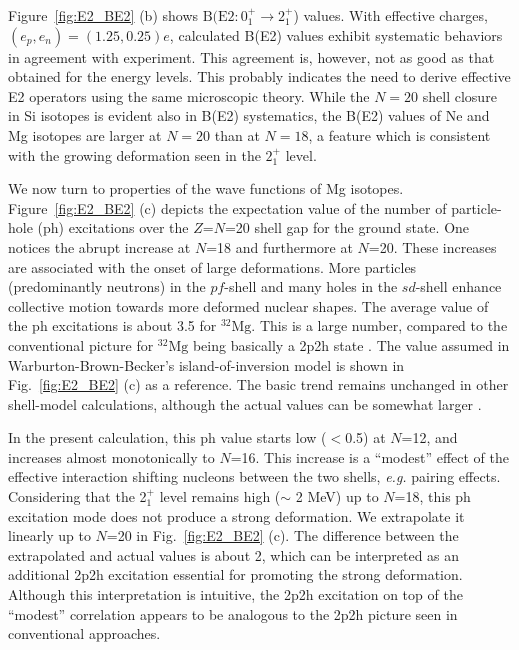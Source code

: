 \documentclass[aps,prl,twocolumn,groupedaddress,showkeys,showpacs,floatfix,superscriptaddress]{revtex4-1}
\def\Nu#1#2#3{{}^{#2}_{#3}\mathrm{#1}}
\newcommand\+{^\dagger}
\begin{document}
Figure~\ref{fig:E2_BE2} (b) shows 
$\mathrm{B(E2}: 0_1^{+}\rightarrow 2_1^{+}$) values. 
With effective charges, $(e_p,e_n)=(1.25, 0.25)e$,  
calculated B(E2) values exhibit systematic behaviors in agreement with experiment. 
This agreement is, however, not as good as that obtained for the energy levels.  
This probably indicates the need to derive effective E2 operators using the same microscopic theory.
While the $N=20$ shell closure in Si isotopes is evident also in B(E2) systematics, 
the B(E2) values of Ne and Mg isotopes are larger at $N=20$ 
than at $N=18$, a feature which is consistent with the growing deformation %
seen in the $2^{+}_1$ level.

We now turn to properties of the wave functions of Mg isotopes.  Figure~\ref{fig:E2_BE2} (c) 
depicts the expectation value of the number of particle-hole (ph) excitations over the $Z$=$N$=20 
shell gap for the ground state.  One notices the abrupt increase 
at $N$=18 and furthermore at $N$=20.  These increases are associated with the onset of large deformations.
More particles (predominantly neutrons) in the $pf$-shell and many holes in the $sd$-shell enhance   
collective motion towards more deformed nuclear shapes.
The average value of the ph excitations is about 3.5 for $\Nu{Mg}{32}{}$.  This is a large number, 
compared to the conventional picture for $\Nu{Mg}{32}{}$ being basically a 2p2h state 
\cite{Warburton:1990vw,Fukunishi:1992ic,PhysRevC.60.054315,Caurier:2013aoa,RevModPhys.77.427}.  
The value assumed in Warburton-Brown-Becker's island-of-inversion model \cite{Warburton:1990vw} 
is shown in Fig.~\ref{fig:E2_BE2} (c) as a reference.  The basic trend remains unchanged in other shell-model 
calculations, although the actual values can be somewhat larger \cite{Fukunishi:1992ic,PhysRevC.60.054315,Caurier:2013aoa,RevModPhys.77.427}.  

In the present calculation, this ph value starts low ($<$0.5) at $N$=12, and increases almost 
monotonically to $N$=16.  
This increase is a ``modest'' effect of the effective interaction shifting nucleons between the two shells, 
{\it e.g.} pairing effects. 
Considering that the 2$^+_1$ level remains high ($\sim$ 2 MeV) up to $N$=18, 
this ph excitation mode does not produce a strong deformation.
We extrapolate it linearly up to $N$=20 in Fig.~\ref{fig:E2_BE2} (c).  
The difference between the extrapolated and actual values is about 2, which can be
interpreted as an additional 2p2h excitation essential for promoting the strong deformation.
Although this interpretation is intuitive, the 2p2h excitation on top of the ``modest'' correlation 
appears to be analogous to the 2p2h picture seen in  conventional approaches.
\end{document}
